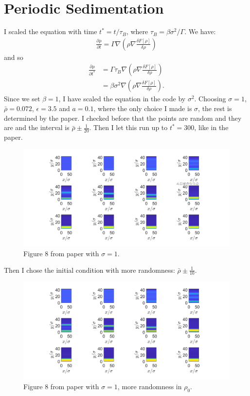 \documentclass[11pt, a4paper]{article}
\theoremstyle{definition}
\begin{document}
	



\section*{Periodic Sedimentation}

I scaled the equation with time $t^* = t/ \tau_B$, where $\tau_B = \beta \sigma^2/ \Gamma$.
We have:
\begin{align*}
	\frac{\partial \rho}{\partial t} = \Gamma \nabla \left(\rho \nabla \frac{\delta F[\rho]}{\delta \rho}\right)
\end{align*}
and so
\begin{align*}
	\frac{\partial \rho}{\partial t^*} &= \Gamma \tau_B \nabla \left(\rho \nabla \frac{\delta F[\rho]}{\delta \rho}\right)\\
	& = \beta \sigma^2 \nabla \left(\rho \nabla \frac{\delta F[\rho]}{\delta \rho}\right).
\end{align*}
Since we set $\beta = 1$, I have scaled the equation in the code by $\sigma^2$.
Choosing $\sigma = 1$, $\bar \rho = 0.072$, $\epsilon = 3.5$ and $a =0.1$, where the only choice I made is $\sigma$, the rest is determined by the paper. I checked before that the points are random and they are and the interval is $\bar \rho \pm \frac{1}{20}$. Then I let this run up to $t^* = 300$, like in the paper.
\begin{figure}[h]
	\centering
	\includegraphics[scale=0.4]{Sed1.png}
	\caption{Figure 8 from paper with $\sigma = 1$.} 
	\label{F1}
\end{figure}
Then I chose the initial condition with more randomness: $\bar \rho \pm \frac{1}{10}$.
\begin{figure}[h]
	\centering
	\includegraphics[scale=0.4]{Sed2.png}
	\caption{Figure 8 from paper with $\sigma = 1$, more randomness in $\rho_0$.} 
	\label{F1a}
\end{figure}
\end{document}
